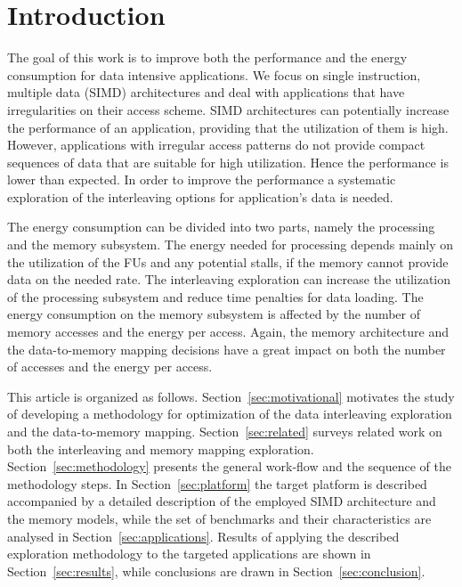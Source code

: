 \documentclass[prodmode,acmtodaes]{acmsmall}
\begin{document}
\maketitle

\section{Introduction}

The goal of this work is to improve both the performance and the energy consumption for data intensive applications. 
We focus on single instruction, multiple data (SIMD) architectures and deal with applications that have irregularities on their access scheme. 
SIMD architectures can potentially increase the performance of an application, providing that the utilization of them is high. 
However, applications with irregular access patterns do not provide compact sequences of data that are suitable for high utilization. 
Hence the performance is lower than expected. 
In order to improve the performance a systematic exploration of the interleaving options for application's data is needed. 

The energy consumption can be divided into two parts, namely the processing and the memory subsystem. 
The energy needed for processing depends mainly on the utilization of the FUs and any potential stalls, if the memory cannot provide data on the needed rate.
The interleaving exploration can increase the utilization of the processing subsystem and reduce time penalties for data loading.   
The energy consumption on the memory subsystem is affected by the number of memory accesses and the energy per access. 
Again, the memory architecture and the data-to-memory mapping decisions have a great impact on both the number of accesses and the energy per access.

This article is organized as follows. 
Section~\ref{sec:motivational} motivates the study of developing a methodology for optimization of the data interleaving exploration and the data-to-memory mapping. 
Section~\ref{sec:related} surveys related work on both the interleaving and memory mapping exploration.
Section~\ref{sec:methodology} presents the general work-flow and the sequence of the methodology steps.
In Section~\ref{sec:platform} the target platform is described accompanied by a detailed description of the employed SIMD architecture and the memory models, while the set of benchmarks and their characteristics are analysed in Section~\ref{sec:applications}. 
Results of applying the described exploration methodology to the targeted applications are shown in Section~\ref{sec:results}, while conclusions are drawn in Section~\ref{sec:conclusion}. 
\end{document}
